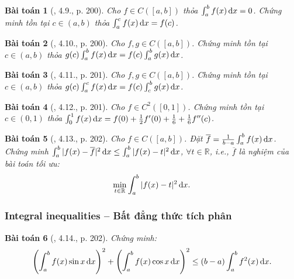\documentclass{article}
\newtheorem{baitoan}{Bài toán}
\begin{document}
\begin{baitoan}[\cite{Quoc_Long_Dat_Nam_VMC}, 4.9., p. 200]
	Cho $f\in C([a,b])$ thỏa $\int_a^b f(x)\,{\rm d}x = 0$. Chứng minh tồn tại $c\in(a,b)$ thỏa $\int_a^c f(x)\,{\rm d}x = f(c)$.
\end{baitoan}

\begin{baitoan}[\cite{Quoc_Long_Dat_Nam_VMC}, 4.10., p. 200]
	Cho $f,g\in C([a,b])$. Chứng minh tồn tại $c\in(a,b)$ thỏa $g(c)\int_a^b f(x)\,{\rm d}x = f(c)\int_a^b g(x)\,{\rm d}x$.
\end{baitoan}

\begin{baitoan}[\cite{Quoc_Long_Dat_Nam_VMC}, 4.11., p. 201]
	Cho $f,g\in C([a,b])$. Chứng minh tồn tại $c\in(a,b)$ thỏa $g(c)\int_a^c f(x)\,{\rm d}x = f(c)\int_c^b g(x)\,{\rm d}x$.
\end{baitoan}

\begin{baitoan}[\cite{Quoc_Long_Dat_Nam_VMC}, 4.12., p. 201]
	Cho $f\in C^2([0,1])$. Chứng minh tồn tại $c\in(0,1)$ thỏa $\int_0^1 f(x)\,{\rm d}x = f(0) + \frac{1}{2}f'(0) + \frac{1}{6} + \frac{1}{6}f''(c)$.
\end{baitoan}

\begin{baitoan}[\cite{Quoc_Long_Dat_Nam_VMC}, 4.13., p. 202]
	Cho $f\in C([a,b])$. Đặt $\overline{f} = \frac{1}{b - a}\int_a^b f(x)\,{\rm d}x$. Chứng minh $\int_a^b |f(x) - \overline{f}|^2\,{\rm d}x\le\int_a^b |f(x) - t|^2\,{\rm d}x$, $\forall t\in\mathbb{R}$, i.e., $\overline{f}$ là nghiệm của bài toán tối ưu:
	\begin{equation*}
		\min_{t\in\mathbb{R}} \int_a^b |f(x) - t|^2\,{\rm d}x.
	\end{equation*}
\end{baitoan}


\subsubsection{Integral inequalities -- Bất đẳng thức tích phân}

\begin{baitoan}[\cite{Quoc_Long_Dat_Nam_VMC}, 4.14., p. 202]
	Chứng minh:
	\begin{equation*}
		\left(\int_a^b f(x)\sin x\,{\rm d}x\right)^2 + \left(\int_a^b f(x)\cos x\,{\rm d}x\right)^2\le(b - a)\int_a^b f^2(x)\,{\rm d}x.
	\end{equation*}
\end{baitoan}
\end{document}
